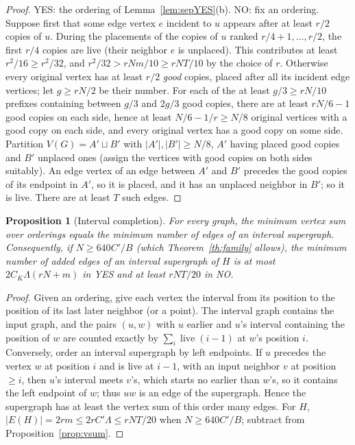 \documentclass[11pt,letterpaper]{article}
\newtheorem{proposition}[theorem]{Proposition}
\theoremstyle{definition}
\theoremstyle{remark}
\DeclareMathOperator{\live}{live}
\begin{document}
\begin{proof}
YES: the ordering of Lemma~\ref{lem:sepYES}(b). NO: fix an ordering. Suppose
first that some edge vertex \(e\) incident to \(u\) appears after at least
\(r/2\) copies of \(u\). During the placements of the copies of \(u\) ranked
\(r/4+1,\dots,r/2\), the first \(r/4\) copies are live (their neighbor
\(e\) is unplaced). This contributes at least \(r^2/16\ge r^2/32\), and
\(r^2/32>rNm/10\ge rNT/10\) by the choice of \(r\). Otherwise every original
vertex has at least \(r/2\) \emph{good} copies, placed after all its incident
edge vertices; let \(g\ge rN/2\) be their number. For each of the at least
\(g/3\ge rN/10\) prefixes containing between \(g/3\) and \(2g/3\) good copies,
there are at least \(rN/6-1\) good copies on each side, hence at least
\(N/6-1/r\ge N/8\) original vertices with a good copy on each side, and every
original vertex has a good copy on some side. Partition \(V(G)=A'\sqcup B'\)
with \(|A'|,|B'|\ge N/8\), \(A'\) having placed good copies and \(B'\)
unplaced ones (assign the vertices with good copies on both sides suitably).
An edge vertex of an edge between \(A'\) and \(B'\) precedes the good copies
of its endpoint in \(A'\), so it is placed, and it has an unplaced neighbor in
\(B'\); so it is live. There are at least \(T\) such edges.
\end{proof}

\begin{proposition}[Interval completion]\label{prop:interval}
For every graph, the minimum vertex sum over orderings equals the minimum
number of edges of an interval supergraph. Consequently, if \(N\ge640C'/B\)
(which Theorem~\ref{th:family} allows), the minimum number of \emph{added}
edges of an interval supergraph of \(H\) is at most \(2C_K\Lambda(rN+m)\) in
YES and at least \(rNT/20\) in NO.
\end{proposition}

\begin{proof}
Given an ordering, give each vertex the interval from its position to the
position of its last later neighbor (or a point). The interval graph
contains the input graph, and the pairs \((u,w)\) with \(u\) earlier and
\(u\)'s interval containing the position of \(w\) are counted exactly by
\(\sum_i\live(i-1)\) at \(w\)'s position \(i\). Conversely, order an interval
supergraph by left endpoints. If \(u\) precedes the vertex \(w\) at
position \(i\) and is live at \(i-1\), with an input neighbor \(v\) at
position \(\ge i\), then \(u\)'s interval meets \(v\)'s, which starts no
earlier than \(w\)'s, so it contains the left endpoint of \(w\); thus
\(uw\) is an edge of the supergraph. Hence the supergraph has at least the
vertex sum of this order many edges. For \(H\), \(|E(H)|=2rm\le2rC'\Lambda
\le rNT/20\) when \(N\ge640C'/B\); subtract from Proposition~\ref{prop:vsum}.
\end{proof}
\end{document}
